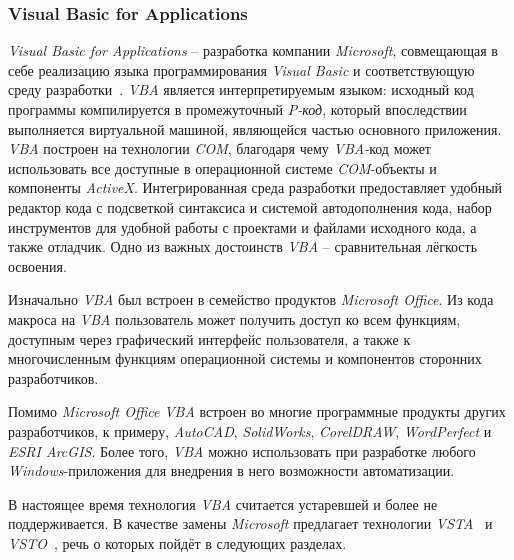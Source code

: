 \subsubsection{Visual Basic for Applications}

{\it Visual Basic for Applications} -- разработка компании {\it Microsoft}, совмещающая в себе реализацию языка программирования {\it Visual Basic} и соответствующую среду разработки~\cite{mastering-vba}. {\it VBA} является интерпретируемым языком: исходный код программы компилируется в промежуточный {\it P-код}, который впоследствии выполняется виртуальной машиной, являющейся частью основного приложения. {\it VBA} построен на технологии {\it COM}, благодаря чему {\it VBA-}код может использовать все доступные в операционной системе {\it COM}-объекты и компоненты {\it ActiveX}. Интегрированная среда разработки предоставляет удобный редактор кода с подсветкой синтаксиса и системой автодополнения кода, набор инструментов для удобной работы с проектами и файлами исходного кода, а также отладчик. Одно из важных достоинств {\it VBA} -- сравнительная лёгкость освоения.

Изначально {\it VBA} был встроен в семейство продуктов {\it Microsoft Office}. Из кода макроса на {\it VBA} пользователь может получить доступ ко всем функциям, доступным через графический интерфейс пользователя, а также к многочисленным функциям операционной системы и компонентов сторонних разработчиков.

Помимо {\it Microsoft Office} {\it VBA} встроен во многие программные продукты других разработчиков, к примеру,  {\it AutoCAD}, {\it SolidWorks}, {\it CorelDRAW}, {\it WordPerfect} и {\it ESRI ArcGIS}. Более того, {\it VBA} можно использовать при разработке любого {\it Windows}-приложения для внедрения в него возможности автоматизации. 

В настоящее время технология {\it VBA} считается устаревшей и более не поддерживается. В качестве замены {\it Microsoft} предлагает технологии {\it VSTA}~\cite{vsta-website} и {\it VSTO}~\cite{vsto-website}, речь о которых пойдёт в следующих разделах.